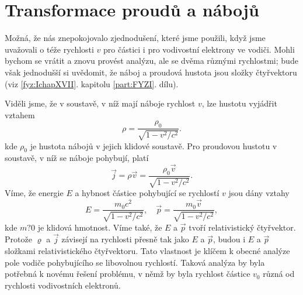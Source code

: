   \section{Transformace proudů a nábojů}\label{fyz:IIchapXIIIsecVII}
    Možná, že nás znepokojovalo zjednodušení, které jsme použili, když jsme uvažovali o téže
    rychlosti \(v\) pro částici i pro vodivostní elektrony ve vodiči. Mohli bychom se vrátit a znovu
    provést analýzu, ale se dvěma různými rychlostmi; bude však jednodušší si uvědomit, že náboj a
    proudová hustota jsou složky čtyřvektoru (viz \ref{fyz:IchapXVII}. kapitolu \ref{part:FYZI}.
    dílu). 
    
    Viděli jsme, že v soustavě, v níž mají náboje rychlost \(v\), lze hustotu vyjádřit vztahem
    \begin{equation*}
      ρ=\dfrac{ρ_0}{\sqrt{1−v^2/c^2}}.
    \end{equation*}
    kde \(ρ_0\) je hustota nábojů v jejich klidové soustavě. Pro proudovou hustotu v soustavě, v níž
    se náboje pohybují, platí
    \begin{equation}\label{fyz:eq823}
      \vec{j}=ρ\vec{v}=\dfrac{ρ_0\vec{v}}{\sqrt{1−v^2/c^2}}.
    \end{equation}
    Víme, že energie \(E\) a hybnost částice pohybující se rychlostí \(v\) jsou dány vztahy
    \begin{equation*}
      E=\dfrac{m_0c^2}{\sqrt{1−v^2/c^2}}, \quad \vec{p}=\dfrac{m_0\vec{v}}{\sqrt{1−v^2/c^2}},
    \end{equation*}
    kde \(m?0\) je klidová hmotnost. Víme také, že \(E\) a \(\vec{p}\) tvoří relativistický
    čtyřvektor. Protože \(\varrho\) a \(\vec{j}\) závisejí na rychlosti přesně tak jako \(E\) a
    \(\vec{p}\), budou i \(E\) a \(\vec{p}\) složkami relativistického čtyřvektoru. Tato vlastnost
    je klíčem k obecné analýze pole vodiče pohybujícího se libovolnou rychlostí. Taková analýza by
    byla potřebná k novému řešení problému, v němž by byla rychlost částice \(v_0\) různá od
    rychlosti vodivostních elektronů.

